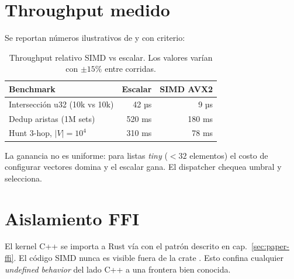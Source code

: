 \section{Throughput medido}

Se reportan números ilustrativos de 
y  con criterio:

\begin{table}[H]
\centering
\small
\begin{tabular}{@{}lrr@{}}
\toprule
Benchmark & Escalar & SIMD AVX2 \\
\midrule
Intersección u32 (10k vs 10k) & 42 µs & 9 µs \\
Dedup aristas (1M sets)        & 520 ms & 180 ms \\
Hunt 3-hop, $|V|=10^4$         & 310 ms & 78 ms \\
\bottomrule
\end{tabular}
\caption{Throughput relativo SIMD vs escalar. Los valores varían
con $\pm 15\%$ entre corridas.}
\label{tab:paper-bench-simd}
\end{table}

La ganancia no es uniforme: para listas \emph{tiny} ($<32$
elementos) el costo de configurar vectores domina y el escalar
gana. El dispatcher chequea umbral y selecciona.

\section{Aislamiento FFI}

El kernel C++ se importa a Rust vía  con el
patrón descrito en cap.~\ref{sec:paper-ffi}. El código SIMD
nunca es visible fuera de la crate . Esto
confina cualquier \emph{undefined behavior} del lado C++ a una
frontera bien conocida.
